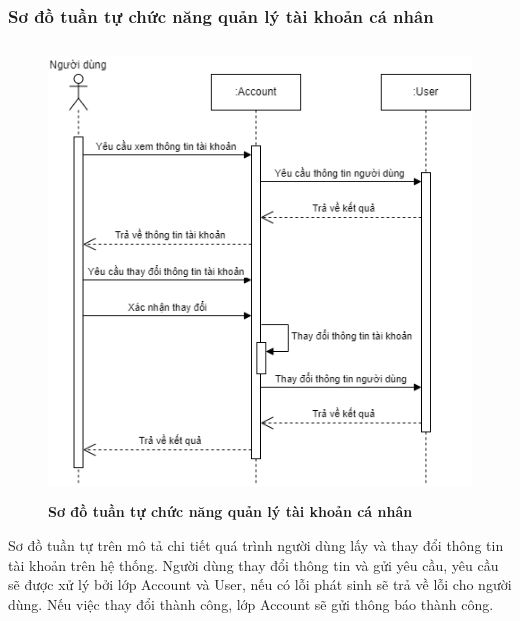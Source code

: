 \subsubsection{Sơ đồ tuần tự chức năng quản lý tài khoản cá nhân}
\begin{figure}[H]
  \centering
  \includegraphics[width=12cm,height=12cm]{Images/sequence/sequence_manage_info.png}
  \caption[Sơ đồ tuần tự chức năng quản lý tài khoản cá nhân]{\bfseries \fontsize{12pt}{0pt}
  \selectfont Sơ đồ tuần tự chức năng quản lý tài khoản cá nhân}
  \label{sequence_account} %
\end{figure}
Sơ đồ tuần tự trên mô tả chi tiết quá trình người dùng lấy và thay đổi thông tin tài khoản trên hệ thống. Người dùng thay đổi thông tin và gửi yêu cầu, 
yêu cầu sẽ được xử lý bởi lớp Account và User, nếu có lỗi phát sinh sẽ trả về lỗi cho người dùng. Nếu việc thay đổi thành công, lớp Account sẽ gửi thông báo 
thành công.  

